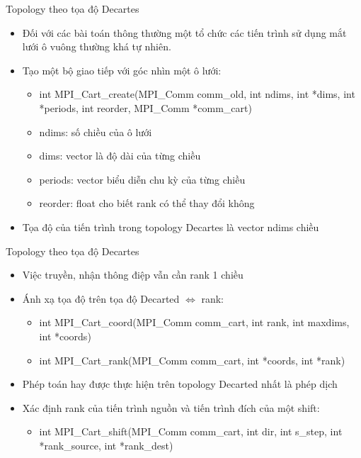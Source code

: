 \documentclass[10pt]{beamer}
\theoremstyle{remark}
\numberwithin{algocf}{section}
\numberwithin{equation}{section}
\numberwithin{dl}{section}
\numberwithin{figure}{section}
\begin{document}
\begin{frame}{Topology theo tọa độ Decartes}
    \begin{itemize}
        \item Đối với các bài toán thông thường một tổ chức các tiến trình sử dụng mắt lưới ô vuông thường khá tự nhiên.
        \item Tạo một bộ giao tiếp với góc nhìn một ô lưới:
        \begin{itemize}
            \item int MPI\_Cart\_create(MPI\_Comm comm\_old, int ndims,
                                      int *dims, int *periods, int reorder,
                                      MPI\_Comm *comm\_cart)
            \item ndims: số chiều của ô lưới
            \item dims: vector là độ dài của từng chiều
            \item periods: vector biểu diễn chu kỳ của từng chiều
            \item reorder: float cho biết rank có thể thay đổi không
        \end{itemize}
        \item Tọa độ của tiến trình trong topology Decartes là vector ndims chiều
    \end{itemize}
\end{frame}

\begin{frame}{Topology theo tọa độ Decartes}
    \begin{itemize}
        \item Việc truyền, nhận thông điệp vẫn cần rank 1 chiều
        \item Ánh xạ tọa độ trên tọa độ Decarted $\Leftrightarrow$ rank:
        \begin{itemize}
            \item int MPI\_Cart\_coord(MPI\_Comm comm\_cart, int rank, int maxdims,
                                      int *coords) 
            \item int MPI\_Cart\_rank(MPI\_Comm comm\_cart, int *coords, int *rank) 
        \end{itemize}
        \item Phép toán hay được thực hiện trên topology Decarted nhất là phép dịch
        \item Xác định rank của tiến trình nguồn và tiến trình đích của một shift:
        \begin{itemize}
            \item int MPI\_Cart\_shift(MPI\_Comm comm\_cart, int dir, int s\_step,
                                       int *rank\_source, int *rank\_dest)
        \end{itemize}
    \end{itemize}
\end{frame}
\end{document}
